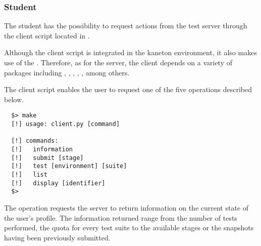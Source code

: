%
%
\subsubsection{Student}

The student has the possibility to request actions from the test server
through the client script located in .


Although the client script is integrated in the kaneton environment, it also
makes use of the . Therefore, as for the server, the client depends
on a variety of  packages including , ,
, , ,  among others.


The client script enables the user to request one of the five operations
described below.

\begin{verbatim}
  $> make
  [!] usage: client.py [command]

  [!] commands:
  [!]   information
  [!]   submit [stage]
  [!]   test [environment] [suite]
  [!]   list
  [!]   display [identifier]
  $>
\end{verbatim}

The  operation requests the server to return information
on the current state of the user's profile. The information returned range
from the number of tests performed, the quota for every test suite to the
available stages or the snapshots having been previously submitted.

